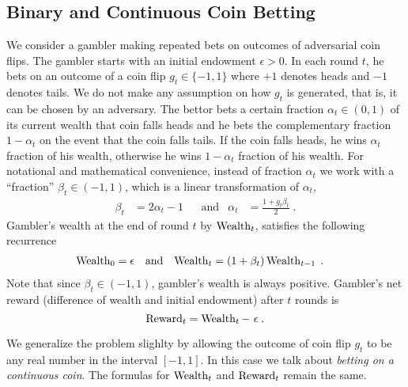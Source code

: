 \subsection{Binary and Continuous Coin Betting}

We consider a gambler making repeated bets on outcomes of adversarial coin
flips. The gambler starts with an initial endowment $\epsilon > 0$. In each
round $t$, he bets on an outcome of a coin flip $g_t \in \{-1,1\}$ where $+1$
denotes heads and $-1$ denotes tails. We do not make any assumption on how $g_t$
is generated, that is, it can be chosen by an adversary. The bettor bets a
certain fraction $\alpha_t \in (0,1)$ of its current wealth that coin falls
heads and he bets the complementary fraction $1-\alpha_t$ on the event that
the coin falls tails. If the coin falls heads, he wins $\alpha_t$ fraction
of his wealth, otherwise he wins $1-\alpha_t$ fraction of his wealth.
For notational and mathematical convenience, instead of fraction $\alpha_t$ we
work with a ``fraction'' $\beta_t \in (-1,1)$, which is a linear transformation
of $\alpha_t$,
\begin{align*}
\beta_t &= 2 \alpha_t - 1 &
& \text{and} &
\alpha_t & = \frac{1 + g_t \beta_t}{2} \; .
\end{align*}
Gambler's wealth at the end of round $t$ by $\operatorname{Wealth}_t$, satisfies the following
recurrence
\begin{align*}
\operatorname{Wealth}_0 & = \epsilon &
& \text{and} &
\operatorname{Wealth}_t & = (1+\beta_t) \operatorname{Wealth}_{t-1} \; .
\end{align*}
Note that since $\beta_t \in (-1,1)$, gambler's wealth is always positive.
Gambler's net reward (difference of wealth and initial endowment) after $t$
rounds is
$$
\Reward_t = \Wealth_t - \ \epsilon \; .
$$

We generalize the problem slighlty by allowing the outcome of coin flip $g_t$ to
be any real number in the interval $[-1,1]$. In this case we talk about
\emph{betting on a continuous coin}. The formulas for $\operatorname{Wealth}_t$ and
$\operatorname{Reward}_t$ remain the same.
